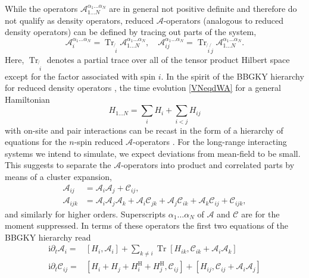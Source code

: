 \documentclass[aps,prl,showpacs,amsmath,amssymb,superscriptaddress,reprint,10pt]{revtex4-1}
\newcommand\ii{{\mathrm{i}}}
\newcommand{\Com}[2]{\left[{#1},{#2}\right]}
\DeclareMathOperator{\Tr}{{Tr}}
\begin{document}
\begin{bibunit}
While the operators $\mathscr{A}_{1\dotsc N}^{\alpha_1\dotsc\alpha_N}$ are in general not positive definite and therefore do not qualify as density operators, reduced $\mathscr{A}$-operators (analogous to reduced density operators) can be defined by tracing out parts of the system,
\begin{equation}
\mathscr{A}_i^{\alpha_1\dotsc\alpha_N}=\Tr_{\not{\,i}} \mathscr{A}_{1\dotsc N}^{\alpha_1\dotsc\alpha_N},\quad \mathscr{A}_{ij}^{\alpha_1\dotsc\alpha_N}=\Tr_{\not{\,i}\not{\,j}} \mathscr{A}_{1\dotsc N}^{\alpha_1\dotsc\alpha_N}.
\end{equation}
Here, $\Tr_{\not{\,i}}$ denotes a partial trace over all of the tensor product Hilbert space except for the factor associated with spin $i$. In the spirit of the BBGKY hierarchy for reduced density operators \cite{Bonitz}, the time evolution \eqref{VNeqdWA} for a general Hamiltonian
\begin{equation}\label{e:Hgen}
H_{1\dotsc N} = \sum_i H_i + \sum_{i<j}H_{ij}
\end{equation}
with on-site and pair interactions can be recast in the form of a hierarchy of equations for the $n$-spin reduced $\mathscr{A}$-operators \cite{Note1}. For the long-range interacting systems we intend to simulate, we expect deviations from mean-field to be small. This suggests to separate the $\mathscr{A}$-operators into product and correlated parts by means of a cluster expansion,
\begin{subequations}
\begin{align}
\mathscr{A}_{ij}&=\mathscr{A}_i \mathscr{A}_j+\mathscr{C}_{ij},\label{e:cluster1}\\
\mathscr{A}_{ijk}&=\mathscr{A}_i \mathscr{A}_j \mathscr{A}_k + \mathscr{A}_i \mathscr{C}_{jk} + \mathscr{A}_j \mathscr{C}_{ik} + \mathscr{A}_k \mathscr{C}_{ij} + \mathscr{C}_{ijk},\label{e:cluster2}
\end{align}
\end{subequations}
and similarly for higher orders. Superscripts $\alpha_1\dotsc\alpha_N$ of $\mathscr{A}$ and $\mathscr{C}$ are for the moment suppressed. In terms of these operators the first two equations of the BBGKY hierarchy read
\begin{subequations}
\begin{align}
\ii\partial_t \mathscr{A}_i=&\Com{H_i}{\mathscr{A}_i}+\sum_{k\neq i}\Tr\Com{H_{ik}}{\mathscr{C}_{ik}+\mathscr{A}_i \mathscr{A}_k}\label{e:1st_order}\\
\ii\partial_t \mathscr{C}_{ij}=&\Com{H_i+H_j+H_i^\text{H}+H_j^\text{H}}{\mathscr{C}_{ij}}+\Com{H_{ij}}{\mathscr{C}_{ij}+\mathscr{A}_i \mathscr{A}_j}\nonumber\\

\end{align}
\end{subequations}
\end{bibunit}
\end{document}
